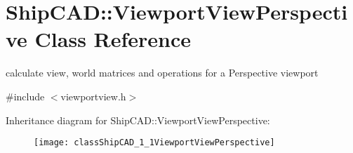 \hypertarget{classShipCAD_1_1ViewportViewPerspective}{}\section{Ship\+C\+AD\+:\+:Viewport\+View\+Perspective Class Reference}
\label{classShipCAD_1_1ViewportViewPerspective}


calculate view, world matrices and operations for a Perspective viewport  




{\ttfamily \#include $<$viewportview.\+h$>$}

Inheritance diagram for Ship\+C\+AD\+:\+:Viewport\+View\+Perspective\+:\begin{figure}[H]
\begin{center}
\leavevmode
\texttt{[image: classShipCAD\_1\_1ViewportViewPerspective]}
\end{center}
\end{figure}
